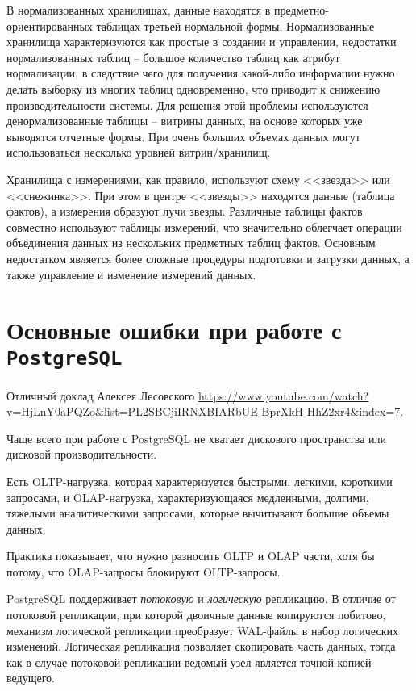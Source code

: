\documentclass[%
	11pt,
	a4paper,
	utf8,
		]{article}
\begin{document}
В нормализованных хранилищах, данные находятся в предметно-ориентированных таблицах третьей нормальной формы. Нормализованные хранилища характеризуются как простые в создании и управлении, недостатки нормализованных таблиц -- большое количество таблиц как атрибут нормализации, в следствие чего для получения какой-либо информации нужно делать выборку из многих таблиц одновременно, что приводит к снижению производительности системы. Для решения этой проблемы используются денормализованные таблицы -- витрины данных, на основе которых уже выводятся отчетные формы. При очень больших объемах данных могут использоваться несколько уровней витрин/хранилищ.

Хранилища с измерениями, как правило, используют схему <<звезда>> или <<снежинка>>. При этом в центре <<звезды>> находятся данные (таблица фактов), а измерения образуют лучи звезды. Различные таблицы фактов совместно используют таблицы измерений, что значительно облегчает операции объединения данных из нескольких предметных таблиц фактов. Основным недостатком является более сложные процедуры подготовки и загрузки данных, а также управление и изменение измерений данных.

\section{Основные ошибки при работе с \texttt{PostgreSQL}}

Отличный доклад Алексея Лесовского \url{https://www.youtube.com/watch?v=HjLnY0aPQZo&list=PL2SBCjiIRNXBIARbUE-BprXkH-HhZ2xr4&index=7}.

Чаще всего при работе с PostgreSQL не хватает дискового пространства или дисковой производительности.

Есть OLTP-нагрузка, которая характеризуется быстрыми, легкими, короткими запросами, и OLAP-нагрузка, характеризующаяся медленными, долгими, тяжелыми аналитическими запросами, которые вычитывают большие объемы данных.

Практика показывает, что нужно разносить OLTP и OLAP части, хотя бы потому, что OLAP-запросы блокируют OLTP-запросы.

PostgreSQL поддерживает \emph{потоковую} и \emph{логическую} репликацию. В отличие от потоковой репликации, при которой двоичные данные копируются побитово, механизм логической репликации преобразует WAL-файлы в набор логических изменений. Логическая репликация позволяет скопировать часть данных, тогда как в случае потоковой репликации ведомый узел является точной копией ведущего. 
\end{document}
